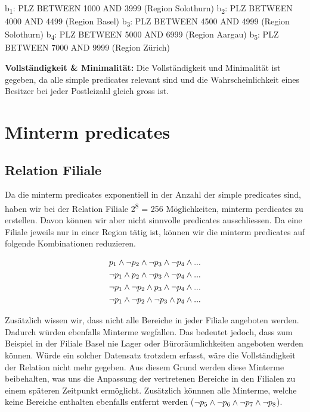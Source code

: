 \documentclass[11pt,a4paper,parskip=half]{scrartcl}
\begin{document}
b\textsubscript{1}: PLZ BETWEEN 1000 AND 3999 (Region Solothurn)\newline
b\textsubscript{2}: PLZ BETWEEN 4000 AND 4499 (Region Basel)\newline
b\textsubscript{3}: PLZ BETWEEN 4500 AND 4999 (Region Solothurn)\newline
b\textsubscript{4}: PLZ BETWEEN 5000 AND 6999 (Region Aargau)\newline
b\textsubscript{5}: PLZ BETWEEN 7000 AND 9999 (Region Zürich)\newline

\textbf{Vollständigkeit \& Minimalität: } Die Vollständigkeit und Minimalität ist gegeben, da alle simple predicates relevant sind und die Wahrscheinlichkeit eines Besitzer bei jeder Postleizahl gleich gross ist.

\section{Minterm predicates}
\subsection{Relation Filiale}
Da die minterm predicates exponentiell in der Anzahl der simple predicates sind, haben wir bei der Relation Filiale 2\textsuperscript{8} = 256 Möglichkeiten, minterm perdicates zu erstellen. Davon können wir aber nicht sinnvolle predicates ausschliessen. Da eine Filiale jeweils nur in einer Region tätig ist, können wir die minterm predicates auf folgende Kombinationen reduzieren.

\begin{align*}
	p\textsubscript{1} \wedge \neg p\textsubscript{2} \wedge \neg p\textsubscript{3} \wedge \neg p\textsubscript{4} \wedge ...\\
	\neg p\textsubscript{1} \wedge p\textsubscript{2} \wedge \neg p\textsubscript{3} \wedge \neg p\textsubscript{4} \wedge ...\\
	\neg p\textsubscript{1} \wedge \neg p\textsubscript{2} \wedge p\textsubscript{3} \wedge \neg p\textsubscript{4} \wedge ...\\
	\neg p\textsubscript{1} \wedge \neg p\textsubscript{2} \wedge \neg p\textsubscript{3} \wedge p\textsubscript{4} \wedge ...\\
\end{align*}

Zusätzlich wissen wir, dass nicht alle Bereiche in jeder Filiale angeboten werden. Dadurch würden ebenfalls Minterme wegfallen. Das bedeutet jedoch, dass zum Beispiel in der Filiale Basel nie Lager oder Büroräumlichkeiten angeboten werden können. Würde ein solcher Datensatz trotzdem erfasst, wäre die Vollständigkeit der Relation nicht mehr gegeben. Aus diesem Grund werden diese Minterme beibehalten, was uns die Anpassung der vertretenen Bereiche in den Filialen zu einem späteren Zeitpunkt ermöglicht. Zusätzlich könnnen alle Minterme, welche keine Bereiche enthalten ebenfalls entfernt werden ($\neg p\textsubscript{5} \wedge \neg p\textsubscript{6} \wedge \neg p\textsubscript{7} \wedge \neg p\textsubscript{8}$).
\end{document}
